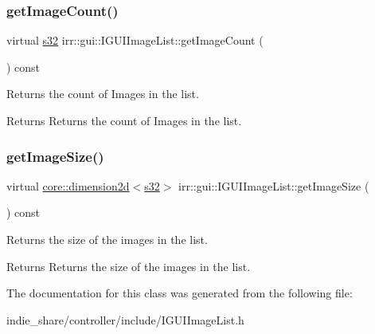 \subsubsection{\texorpdfstring{get\+Image\+Count()}{getImageCount()}}
{\footnotesize\ttfamily virtual \hyperlink{namespaceirr_ac66849b7a6ed16e30ebede579f9b47c6}{s32} irr\+::gui\+::\+I\+G\+U\+I\+Image\+List\+::get\+Image\+Count (\begin{DoxyParamCaption}{ }\end{DoxyParamCaption}) const\hspace{0.3cm}{\ttfamily [pure virtual]}}



Returns the count of Images in the list. 

\begin{DoxyReturn}{Returns}
Returns the count of Images in the list. 
\end{DoxyReturn}
\mbox{\label{classirr_1_1gui_1_1IGUIImageList_a5973353355625da76b24100f16f90539}} 
\subsubsection{\texorpdfstring{get\+Image\+Size()}{getImageSize()}}
{\footnotesize\ttfamily virtual \hyperlink{classirr_1_1core_1_1dimension2d}{core\+::dimension2d}$<$\hyperlink{namespaceirr_ac66849b7a6ed16e30ebede579f9b47c6}{s32}$>$ irr\+::gui\+::\+I\+G\+U\+I\+Image\+List\+::get\+Image\+Size (\begin{DoxyParamCaption}{ }\end{DoxyParamCaption}) const\hspace{0.3cm}{\ttfamily [pure virtual]}}



Returns the size of the images in the list. 

\begin{DoxyReturn}{Returns}
Returns the size of the images in the list. 
\end{DoxyReturn}


The documentation for this class was generated from the following file\+:\begin{DoxyCompactItemize}
\item 
indie\+\_\+share/controller/include/I\+G\+U\+I\+Image\+List.\+h\end{DoxyCompactItemize}
